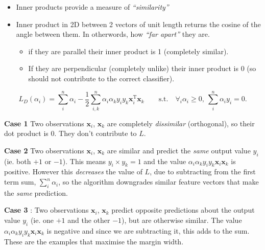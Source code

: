 \documentclass[11pt]{article}
\providecommand{\tightlist}{%
      \setlength{\itemsep}{0pt}\setlength{\parskip}{0pt}}
\begin{document}
\begin{itemize}
\tightlist
\item
  Inner products provide a measure of \emph{``similarity''}
\item
  Inner product in 2D between 2 vectors of unit length returns the
  cosine of the angle between them. In otherwords, how \emph{``far
  apart''} they are.

  \begin{itemize}
  \tightlist
  \item
    if they are parallel their inner product is 1 (completely similar).
  \item
    If they are perpendicular (completely unlike) their inner product is
    0 (so should not contribute to the correct classifier).
  \end{itemize}
\end{itemize}

    \[
L_D(\alpha_i) = \sum_i^n\alpha_i - \frac{1}{2}\sum_{i,k}^n\alpha_i\alpha_ky_iy_k\mathbf{x}_i^{\mathrm T} \mathbf{x}_k \qquad \text{s.t.} \quad \forall_i \alpha_i \geq 0, \ \sum_i^n\alpha_iy_i = 0.
\]

\textbf{Case 1} Two observations \(\mathbf{x}_i\), \(\mathbf{x}_k\) are
completely \emph{dissimilar} (orthogonal), so their dot product is 0.
They don't contribute to \(L\).

\textbf{Case 2} Two observations \(\mathbf{x}_i\), \(\mathbf{x}_k\) are
similar and predict the \emph{same} output value \(y_i\) (ie. both
\(+1\) or \(-1\)). This means \(y_i \times y_k = 1\) and the value
\(\alpha_i\alpha_ky_iy_k\mathbf{x}_i\mathbf{x}_k\) is positive. However
this \emph{decreases} the value of \(L\), due to subtracting from the
first term sum, \(\sum_i^n\alpha_i\), so the algorithm downgrades
similar feature vectors that make the \emph{same} prediction.

\textbf{Case 3} : Two observations \(\mathbf{x}_i\), \(\mathbf{x}_k\)
predict opposite predictions about the output value \(y_i\) (ie. one
\(+1\) and the other \(-1\)), but are otherwise similar. The value
\(\alpha_i\alpha_ky_iy_k\mathbf{x}_i\mathbf{x}_k\) is negative and since
we are subtracting it, this adds to the sum. These are the examples that
maximise the margin width.

    \begin{center}
    \end{center}
    { \hspace*{\fill} \\}
    
\end{document}
